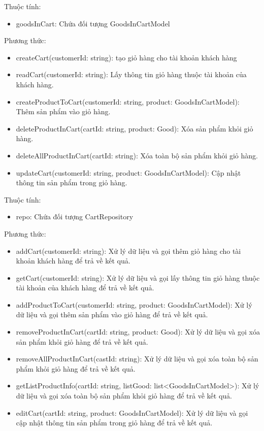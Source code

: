 Thuộc tính:
\begin{itemize}
	\item goodsInCart: Chứa đối tượng GoodsInCartModel
\end{itemize}
Phương thức:
\begin{itemize}
	\item createCart(customerId: string): tạo giỏ hàng cho tài khoản khách hàng
	\item readCart(customerId: string): Lấy thông tin giỏ hàng thuộc tài khoản của khách hàng.
	\item createProductToCart(customerId: string, product: GoodsInCartModel): Thêm sản phẩm vào giỏ hàng.
	\item deleteProductInCart(cartId: string, product: Good): Xóa sản phẩm khỏi giỏ hàng.
	\item deleteAllProductInCart(cartId: string): Xóa toàn bộ sản phẩm khỏi giỏ hàng.
	\item updateCart(customerId: string, product: GoodsInCartModel): Cập nhật thông tin sản phẩm trong giỏ hàng.
\end{itemize}

Thuộc tính:
\begin{itemize}
	\item repo: Chứa đối tượng CartRepository
\end{itemize}
Phương thức:
\begin{itemize}
	\item addCart(customerId: string): Xử lý dữ liệu và gọi thêm giỏ hàng cho tài khoản khách hàng để trả về kết quả.
	\item getCart(customerId: string): Xử lý dữ liệu và gọi lấy thông tin giỏ hàng thuộc tài khoản của khách hàng để trả về kết quả.
	\item addProductToCart(customerId: string, product: GoodsInCartModel): Xử lý dữ liệu và gọi thêm sản phẩm vào giỏ hàng để trả về kết quả.
	\item removeProductInCart(cartId: string, product: Good): Xử lý dữ liệu và gọi xóa sản phẩm khỏi giỏ hàng để trả về kết quả.
	\item removeAllProductInCart(castId: string): Xử lý dữ liệu và gọi xóa toàn bộ sản phẩm khỏi giỏ hàng để trả về kết quả.
	\item getListProductInfo(cartId: string, listGood: list<GoodsInCartModel>): Xử lý dữ liệu và gọi xóa toàn bộ sản phẩm khỏi giỏ hàng để trả về kết quả.
	\item editCart(cartId: string, product: GoodsInCartModel): Xử lý dữ liệu và gọi cập nhật thông tin sản phẩm trong giỏ hàng để trả về kết quả.
\end{itemize}

